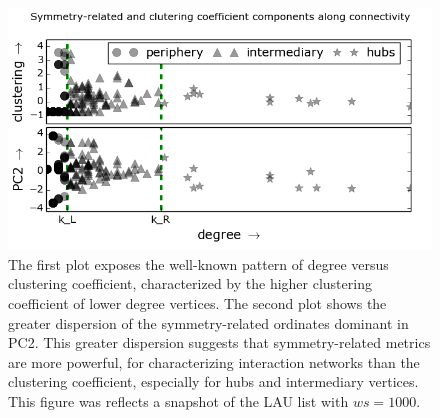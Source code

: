 \documentclass[%
	aip,
	jmp,%
	amsmath,amssymb,
	reprint,%
]{revtex4-1}
\begin{document}
																																																																																					\begin{figure} 
																																																																																						\centering
																																																																																						\includegraphics[width=.45\textwidth]{figs/im13PCAPLOT__}
																																																																																						\caption{The first plot exposes the well-known pattern of degree versus clustering coefficient, characterized by the higher clustering coefficient of lower degree vertices.
																																																																																							The second plot shows the greater dispersion of the symmetry-related ordinates dominant in PC2.
																																																																																							This greater dispersion suggests that symmetry-related metrics are more powerful,
																																																																																							for characterizing interaction networks than the clustering coefficient,
																																																																																							especially for hubs and intermediary vertices.
																																																																																						This figure was reflects a snapshot of the LAU list with $ws= 1000$.}

																																																																																						\label{fig:sym}
																																																																																					\end{figure}
\end{document}
